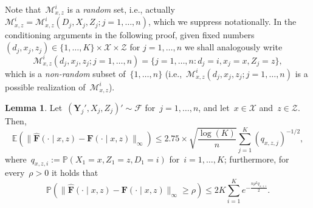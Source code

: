 \documentclass[11pt, a4paper]{article}
\theoremstyle{definition}
\newtheorem{lemma}[theorem]{Lemma}
\begin{document}
Note that~$\mathcal{M}^i_{x, z}$ is a \emph{random} set, i.e., actually~$\mathcal{M}^i_{x, z} = \mathcal{M}^i_{x, z}(D_j, X_j, Z_j; j = 1, \hdots, n)$, which we suppress notationally. In the conditioning arguments in the following proof, given fixed numbers $(d_j, x_j, z_j) \in \{1, \hdots, K\} \times \mathcal{X} \times \mathcal{Z}$ for $j = 1, \hdots, n$ we shall analogously write 
\begin{equation}\label{eqn:nrs}
\mathcal{M}^i_{x, z}(d_j, x_j, z_j; j = 1, \hdots, n) = \{j = 1, \hdots, n: d_j = i, x_j = x, Z_j = z\},
\end{equation} which is a \emph{non-random} subset of~$\{1, \hdots, n\}$ (i.e.,~$\mathcal{M}^i_{x, z}(d_j, x_j, z_j; j = 1, \hdots, n)$ is a possible realization of~$\mathcal{M}^i_{x, z}$).


\begin{lemma}\label{lem:aux2}
Let~$(\bm{Y}_j', X_j, Z_j)' \sim \mathcal{F}$ for~$j =1, \hdots, n$, and let~$x \in \mathcal{X}$ and~$z \in \mathcal{Z}$. Then, %
\begin{equation}\label{eqn:upcdf}
\mathbb{E}\left(\| \hat{\bm{F}}(\cdot \mid x, z) - \bm{F}(\cdot\mid x, z)\|_{\infty} \right) \leq  2.75 \times \sqrt{\frac{\log(K)}{n}} \sum_{j = 1}^K (q_{x,z,j})^{-1/2},
\end{equation}
%
where~$q_{x,z,i} := \mathbb{P}(X_1 = x, Z_1 = z, D_1 = i)$ for~$i = 1, \hdots, K$; furthermore, for every~$\rho > 0$ it holds that
%
\begin{equation}\label{eqn:upcdfprob}
\mathbb{P}\left(\| \hat{\bm{F}}(\cdot \mid x, z) - \bm{F}(\cdot\mid x, z)\|_{\infty} \geq \rho \right) \leq  2K \sum_{i = 1}^K e^{-\frac{n \rho^2 q_{x, z, i}}{2}}.
\end{equation}
\end{lemma}
\end{document}
